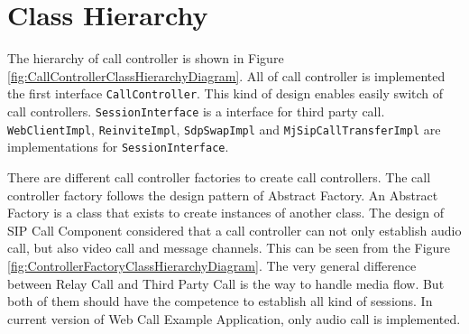 \section{Class Hierarchy}

The hierarchy of call controller is shown in Figure \ref{fig:CallControllerClassHierarchyDiagram}. All of call controller is implemented the first interface \texttt{CallController}. This kind of design enables easily switch of call controllers. \texttt{SessionInterface} is a interface for third party call. \texttt{WebClientImpl}, \texttt{ReinviteImpl}, \texttt{SdpSwapImpl} and \texttt{MjSipCallTransferImpl} are implementations for \texttt{SessionInterface}. 

\begin{sidewaysfigure}
\centering
{}
\caption{Call Controller class hierarchy diagram}
\label{fig:CallControllerClassHierarchyDiagram}
\end{sidewaysfigure}

There are different call controller factories to create call controllers. The call controller factory follows the design pattern of \textsf{Abstract Factory}. An \textsf{Abstract Factory} is a class that exists to create instances of another class\cite{DesignPatternGoF}. The design of SIP Call Component considered that a call controller can not only establish audio call, but also video call and message channels. This can be seen from the Figure \ref{fig:ControllerFactoryClassHierarchyDiagram}. The very general difference between Relay Call and Third Party Call is the way to handle media flow. But both of them should have the competence to establish all kind of sessions. In current version of Web Call Example Application, only audio call is implemented.

\begin{sidewaysfigure}
\centering
{}
\caption{Controller Factory class hierarchy diagram}
\label{fig:ControllerFactoryClassHierarchyDiagram}
\end{sidewaysfigure}



